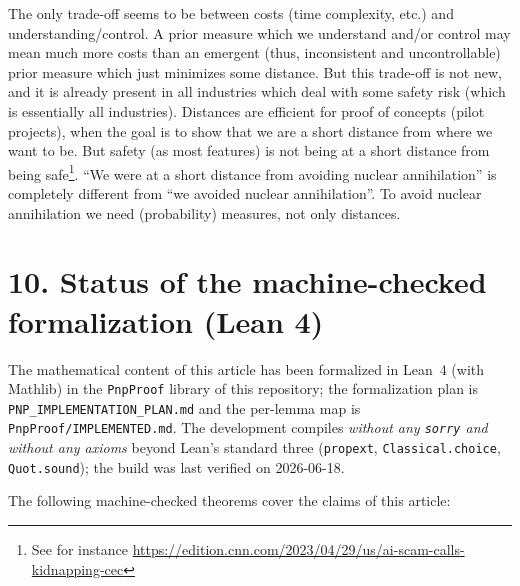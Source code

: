 \documentclass[11pt,a4paper]{report}
\begin{document}
The only trade-off seems to be between costs (time complexity, etc.) and
understanding/control. A prior measure which we understand and/or
control may mean much more costs than an emergent (thus, inconsistent
and uncontrollable) prior measure which just minimizes some distance.
But this trade-off is not new, and it is already present in all
industries which deal with some safety risk (which is essentially all
industries). Distances are efficient for proof of concepts (pilot
projects), when the goal is to show that we are a short distance from
where we want to be. But safety (as most features) is not being at a
short distance from being safe\footnote{See for instance
  \href{https://edition.cnn.com/2023/04/29/us/ai-scam-calls-kidnapping-cec/index.html}{https://edition.cnn.com/2023/04/29/us/ai-scam-calls-kidnapping-cec}}.
``We were at a short distance from avoiding nuclear annihilation'' is
completely different from ``we avoided nuclear annihilation''. To avoid
nuclear annihilation we need (probability) measures, not only distances.

\hypertarget{status-of-the-machine-checked-formalization}{%
\section{10. Status of the machine-checked formalization (Lean
4)}\label{status-of-the-machine-checked-formalization}}

The mathematical content of this article has been formalized in Lean~4
(with Mathlib) in the \texttt{PnpProof} library of this repository; the
formalization plan is \texttt{PNP\_IMPLEMENTATION\_PLAN.md} and the
per-lemma map is \texttt{PnpProof/IMPLEMENTED.md}. The development
compiles \emph{without any \texttt{sorry} and without any axioms} beyond
Lean's standard three (\texttt{propext}, \texttt{Classical.choice},
\texttt{Quot.sound}); the build was last verified on 2026-06-18.

The following machine-checked theorems cover the claims of this article:
\end{document}
